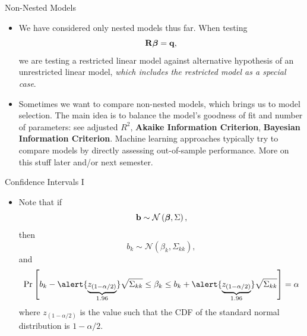 \begin{frame}{Non-Nested Models}
\begin{itemize}
	\item We have considered only nested models thus far. When testing \[
	{\bf R} \boldsymbol{\beta} = {\bf q}, 
	\]
	we are testing a restricted linear model against alternative hypothesis of 
	an unrestricted linear model, \emph{ which includes the restricted model as a special
	case}.

	\medskip
	\item Sometimes we want to compare non-nested models, which brings us to
	model selection. The main idea
	is to balance the model's goodness of fit and number of parameters: see
	adjusted $R^2$, {\bf Akaike Information Criterion}, {\bf Bayesian
	Information Criterion}. Machine learning approaches typically
	try to compare models by directly assessing out-of-sample performance.
	 More on this stuff later and/or next semester.

\end{itemize}
\end{frame}








\begin{frame}{Confidence Intervals I}
\begin{itemize}
	\item Note that if 	\[
		{\bf b} \sim\mathcal{N}\left(\boldsymbol{\beta},\Sigma\right),
	\]
	then \[
		b_{k} \sim\mathcal{N}\left(\beta_k,\Sigma_{kk}\right),	
	\]
	and \[
	\Pr\left[ b_{k} - \alert{\underbrace{z_{\left(1-\alpha/2\right)}}_{1.96}} \sqrt{\Sigma_{kk}} \le \beta_k \le b_k +  \alert{\underbrace{z_{\left(1-\alpha/2\right)}}_{1.96}}  \sqrt{\Sigma_{kk}}  \right] =\alpha 
	\]
	where $ z_{\left(1-\alpha/2\right)} $ is the value such that the CDF of the standard normal distribution is $1-\alpha/2$. 	

\end{itemize}
\end{frame}




